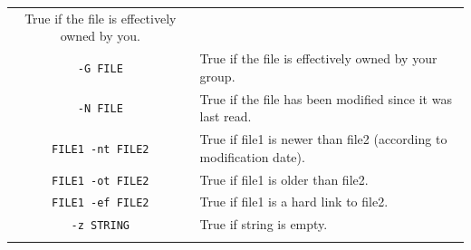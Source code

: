 \documentclass[doctor,openright,twoside]{sjtuthesis}
\newcommand{\passthrough}[1]{#1}
\theoremstyle{plain}
\theoremstyle{definition}
\theoremstyle{remark}
\theoremstyle{ocrenumbox}
\theoremstyle{plain}
\begin{document}
\begin{longtable}[]{@{}cl@{}}
\begin{minipage}[t]{0.74\columnwidth}
True if the file is effectively owned by you.\strut
\end{minipage}\tabularnewline
\begin{minipage}[t]{0.20\columnwidth}\centering
\passthrough{\lstinline!-G FILE!}\strut
\end{minipage} & \begin{minipage}[t]{0.74\columnwidth}\raggedright
True if the file is effectively owned by your group.\strut
\end{minipage}\tabularnewline
\begin{minipage}[t]{0.20\columnwidth}\centering
\passthrough{\lstinline!-N FILE!}\strut
\end{minipage} & \begin{minipage}[t]{0.74\columnwidth}\raggedright
True if the file has been modified since it was last read.\strut
\end{minipage}\tabularnewline
\begin{minipage}[t]{0.20\columnwidth}\centering
\passthrough{\lstinline!FILE1 -nt FILE2!}\strut
\end{minipage} & \begin{minipage}[t]{0.74\columnwidth}\raggedright
True if file1 is newer than file2 (according to modification
date).\strut
\end{minipage}\tabularnewline
\begin{minipage}[t]{0.20\columnwidth}\centering
\passthrough{\lstinline!FILE1 -ot FILE2!}\strut
\end{minipage} & \begin{minipage}[t]{0.74\columnwidth}\raggedright
True if file1 is older than file2.\strut
\end{minipage}\tabularnewline
\begin{minipage}[t]{0.20\columnwidth}\centering
\passthrough{\lstinline!FILE1 -ef FILE2!}\strut
\end{minipage} & \begin{minipage}[t]{0.74\columnwidth}\raggedright
True if file1 is a hard link to file2.\strut
\end{minipage}\tabularnewline
\begin{minipage}[t]{0.20\columnwidth}\centering
\passthrough{\lstinline!-z STRING!}\strut
\end{minipage} & \begin{minipage}[t]{0.74\columnwidth}\raggedright
True if string is empty.\strut
\end{minipage}\tabularnewline
\begin{minipage}[t]{0.20\columnwidth}\centering

\end{minipage}
\end{longtable}
\end{document}

